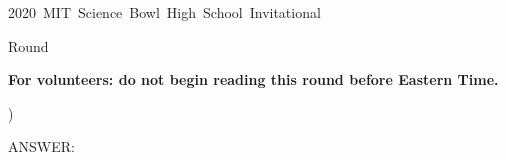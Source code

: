 \documentclass[12pt]{article}
\begin{document}
\begin{center}
  \begin{LARGE}
    {\selectfont
      \mbox{2020 MIT Science Bowl High School Invitational}
      \par Round \roundnumber
    }
  \end{LARGE}
\end{center}

\ifdefined\timewarning
  \begin{huge}
    \color{red}
    \textbf{For volunteers: do not begin reading this round before \timewarning Eastern Time.}
  \end{huge}
\fi

{
  \ifodd\thecsvrow\filbreak\fi

  \begin{center}
    {\textbf{\MakeUppercase{\tb}}}
  \end{center}

  )  \MakeUppercase{\cat} \textit{\mcsa} \question

  \vspace{5pt}
  ANSWER: \answer \vspace{15pt}

  \unless\ifodd\thecsvrow\hrulefill\fi
}
\end{document}
